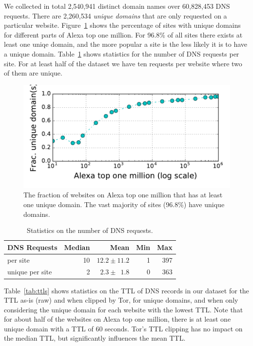 We collected in total 2,540,941 distinct domain names over 60,828,453 DNS
requests. There are 2,260,534 \emph {unique domains} that are only requested on
a particular website. Figure~\ref{fig:unique-domains} shows the percentage of
sites with unique domains for different parts of Alexa top one million.
For 96.8\% of all sites there exists at least one uniqe domain, and the more
popular a site is the less likely it is to have a unique domain.
Table~\ref{tab:dns-requests} shows statistics for the number of DNS requests per
site. For at least half of the dataset we have ten requests per website where
two of them are unique.

\begin{figure}[t]
	\centering
	\includegraphics[width=0.7\linewidth]{figures/dns-unique-domains.pdf}
	\caption{The fraction of websites on Alexa top one million that has at least
	one unique domain. The vast majority of sites (96.8\%) have unique domains.}
	\label{fig:unique-domains}
\end{figure}

\begin{table}[t]
	\centering
	\caption{Statistics on the number of DNS requests.}
	\begin{tabular}{l r r r r}
	\toprule
	\textbf{DNS Requests} & \textbf{Median} & \textbf{Mean} & \textbf{Min} & \textbf{Max} \\
	\midrule
	per site & 10 & $12.2\pm11.2$ & 1 & 397 \\
	unique per site & 2 & $2.3\pm\phantom{0}1.8$ & 0 & 363 \\
	\bottomrule
	\end{tabular}
	\label{tab:dns-requests}
\end{table}

Table~\ref{tab:ttls} shows statistics on the TTL of DNS records in our dataset
for the TTL as-is (raw) and when clipped by Tor, for unique domains, and when
only considering the unique domain for each website with the lowest TTL.
Note that for about half of the websites on Alexa top one million, there is at
least one unique domain with a TTL of 60 seconds. Tor's TTL clipping has no
impact on the median TTL, but significantly influences the mean TTL.

